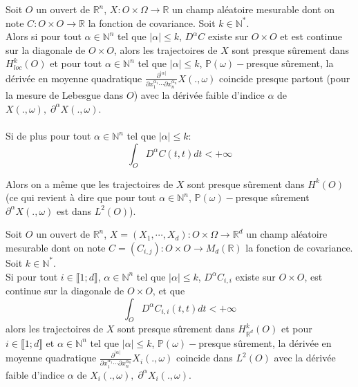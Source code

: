 \begin{theorem}
  Soit $O$ un ouvert de $\mathbb{R}^n$, $X: O \times \Omega \rightarrow \mathbb{R}$ un champ aléatoire
  mesurable dont on note $C: O \times O \rightarrow \mathbb{R}$ la fonction
  de covariance. Soit $k \in \mathbb{N}^{*}$.\\
\noindent Alors si pour tout
  $\alpha \in \mathbb{N}^{n}$ tel que $|\alpha| \leq k$, $D^{\alpha}C$ existe
  sur $O \times O$ et est continue sur la diagonale de $O \times O$, alors
  les trajectoires de $X$ sont presque sûrement dans $H_{loc}^{k}(O)$ et pour
  tout $\alpha \in \mathbb{N}^{n}$ tel que $|\alpha| \leq k$, $\mathbb{P}(\omega)-$presque sûrement, la dérivée en moyenne quadratique $\frac{\partial^{|\alpha|}}{\partial x_{1}^{\alpha_1} \cdots \partial x_{n}^{\alpha_n} } X(.,\omega)$ coincide presque partout (pour la mesure de Lebesgue dans $O$) avec la dérivée faible d'indice $\alpha$ de $X(.,\omega), \; \partial^{\alpha} X(.,\omega)$.\\
~\\  
  Si de plus pour tout $\alpha \in \mathbb{N}^{n}$ tel que $|\alpha| \leq k$:
  \begin{equation}
  \displaystyle\int_O D^{\alpha}C(t,t) dt < +\infty
  \end{equation}

\noindent Alors on a même que les trajectoires de $X$ sont presque sûrement dans $H^{k}(O)$ (ce qui revient à dire que pour tout $\alpha \in \mathbb{N}^{n}$,
  $\mathbb{P}(\omega)-$presque sûrement $\partial^{\alpha} X(.,\omega)$ est dans $L^2(O)$).
\end{theorem}

\begin{corollary}
  \label{RFcorollary}
Soit $O$ un ouvert de $\mathbb{R}^n$, $X = (X_1, \cdots, X_d): O \times \Omega \rightarrow \mathbb{R}^d$ un champ aléatoire
  mesurable dont on note $C = (C_{i,j}): O \times O \rightarrow M_d(\mathbb{R})$ la fonction
  de covariance. Soit $k \in \mathbb{N}^{*}$.\\
\noindent Si pour tout $i \in \llbracket 1;d \rrbracket$,
  $\alpha \in \mathbb{N}^{n}$ tel que $|\alpha| \leq k$, $D^{\alpha}C_{i,i}$ existe
sur $O \times O$, est continue sur la diagonale de $O \times O$, et que
\begin{equation}
\displaystyle\int_O D^{\alpha}C_{i,i}(t,t) dt < +\infty
\end{equation}
alors
  les trajectoires de $X$ sont presque sûrement dans $H_{\mathbb{R}^d}^{k}(O)$ et pour \\$i \in \llbracket 1;d \rrbracket$ et $\alpha \in \mathbb{N}^{n}$ tel que $|\alpha| \leq k$, $\mathbb{P}(\omega)-$presque sûrement, la dérivée en moyenne quadratique $\frac{\partial^{|\alpha|}}{\partial x_{1}^{\alpha_1} \cdots \partial x_{n}^{\alpha_n} } X_i(.,\omega)$ coincide dans $L^2(O)$ avec la dérivée faible d'indice $\alpha$ de $X_i(.,\omega), \; \partial^{\alpha} X_i(.,\omega)$.
\end{corollary}


